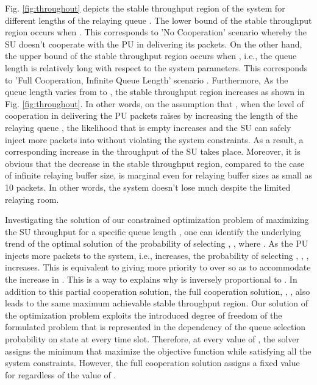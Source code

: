 \documentclass[conference]{IEEEtran}
\begin{document}
Fig. \ref{fig:throughout} depicts the stable throughput region of 
the system for different lengths of the relaying queue . 
The lower bound of the stable throughput region occurs when .
This corresponds to 'No Cooperation' scenario whereby the SU doesn't 
cooperate with the PU in delivering its packets. 
On the other hand, the upper bound of the stable throughput region 
occurs when , i.e., the queue length is relatively long with 
respect to the system parameters. This corresponds to 
'Full Cooperation, Infinite Queue Length' scenario \cite{R_CoopAcc}. 
Furthermore, As the queue length varies from  to , 
the stable throughput region increases as shown in Fig. \ref{fig:throughout}. 
In other words, on the assumption that , 
when the level of cooperation in delivering the PU packets raises by 
increasing the length of the relaying queue , the likelihood that 
 is empty increases and the SU can safely inject more packets 
into  without violating the system constraints. As a result, 
a corresponding increase in the throughput of the SU takes place. 
Moreover, it is obvious that the decrease in the stable throughput region, 
compared to the case of infinite relaying buffer size, is marginal 
even for relaying buffer sizes as small as 10 packets. 
In other words, the system doesn't lose much despite the limited relaying room.





Investigating the solution of our constrained optimization problem
of maximizing the SU throughput for a specific queue length ,
one can identify the underlying trend of the optimal solution of
the probability of selecting , , where .
As the PU injects more packets to the system, i.e., 
increases, the probability of selecting ,
, , increases. This is equivalent to
giving more priority to  over  so as to accommodate the increase in
. This is a way to explains why  is
inversely proportional to . In addition to this partial cooperation solution, 
the full cooperation solution, , ,
also leads to the same maximum achievable stable throughput region. Our
solution of the optimization problem exploits the introduced
degree of freedom of the formulated problem that is represented in
the dependency of the queue selection probability on 
 state at every time slot. Therefore, at
every value of , the solver assigns the minimum
 that maximize the objective function
while satisfying all the system constraints. However, the full
cooperation solution assigns a fixed value for 
regardless of the value of .
\end{document}
